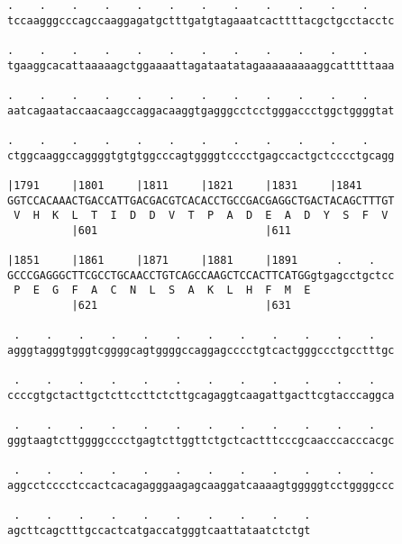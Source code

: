 \documentclass{article}
\begin{document}
\begin{Verbatim}
.    .    .    .    .    .    .    .    .    .    .    .    
tccaagggcccagccaaggagatgctttgatgtagaaatcacttttacgctgcctacctc
                                                            
.    .    .    .    .    .    .    .    .    .    .    .    
tgaaggcacattaaaaagctggaaaattagataatatagaaaaaaaaaggcatttttaaa
                                                            
.    .    .    .    .    .    .    .    .    .    .    .    
aatcagaataccaacaagccaggacaaggtgagggcctcctgggaccctggctggggtat
                                                            
.    .    .    .    .    .    .    .    .    .    .    .    
ctggcaaggccaggggtgtgtggcccagtggggtcccctgagccactgctcccctgcagg
                                                            
|1791     |1801     |1811     |1821     |1831     |1841     
GGTCCACAAACTGACCATTGACGACGTCACACCTGCCGACGAGGCTGACTACAGCTTTGT
 V  H  K  L  T  I  D  D  V  T  P  A  D  E  A  D  Y  S  F  V 
          |601                          |611                
  
|1851     |1861     |1871     |1881     |1891      .    .   
GCCCGAGGGCTTCGCCTGCAACCTGTCAGCCAAGCTCCACTTCATGGgtgagcctgctcc
 P  E  G  F  A  C  N  L  S  A  K  L  H  F  M  E             
          |621                          |631                
  
 .    .    .    .    .    .    .    .    .    .    .    .   
agggtagggtgggtcggggcagtggggccaggagcccctgtcactgggccctgcctttgc
                                                            
 .    .    .    .    .    .    .    .    .    .    .    .   
ccccgtgctacttgctcttccttctcttgcagaggtcaagattgacttcgtacccaggca
                                                            
 .    .    .    .    .    .    .    .    .    .    .    .   
gggtaagtcttggggcccctgagtcttggttctgctcactttcccgcaacccacccacgc
                                                            
 .    .    .    .    .    .    .    .    .    .    .    .   
aggcctcccctccactcacagagggaagagcaaggatcaaaagtgggggtcctggggccc
                                                            
 .    .    .    .    .    .    .    .    .    .
agcttcagctttgccactcatgaccatgggtcaattataatctctgt
                                               
                                               
 

\end{Verbatim}
\end{document}
